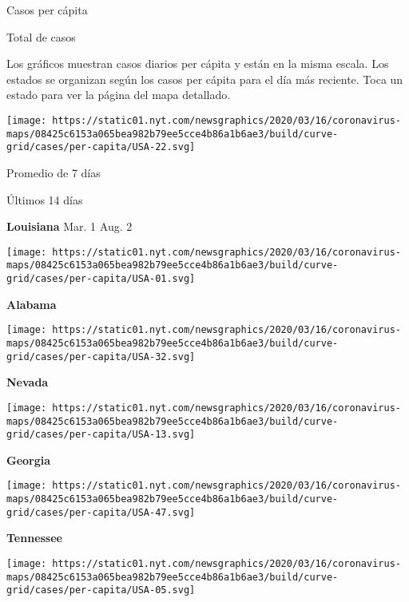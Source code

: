Casos per cápita

Total de casos

Los gráficos muestran casos diarios per cápita y están en la misma
escala. Los estados se organizan según los casos per cápita para el día
más reciente. Toca un estado para ver la página del mapa detallado.

\href{https://www.nytimes.com/interactive/2020/us/louisiana-coronavirus-cases.html}{}

\texttt{[image: https://static01.nyt.com/newsgraphics/2020/03/16/coronavirus-maps/08425c6153a065bea982b79ee5cce4b86a1b6ae3/build/curve-grid/cases/per-capita/USA-22.svg]}

Promedio de 7 días

Últimos 14 días

\textbf{Louisiana} Mar. 1 Aug. 2

\href{https://www.nytimes.com/interactive/2020/us/alabama-coronavirus-cases.html}{}

\texttt{[image: https://static01.nyt.com/newsgraphics/2020/03/16/coronavirus-maps/08425c6153a065bea982b79ee5cce4b86a1b6ae3/build/curve-grid/cases/per-capita/USA-01.svg]}

\textbf{Alabama}

\href{https://www.nytimes.com/interactive/2020/us/nevada-coronavirus-cases.html}{}

\texttt{[image: https://static01.nyt.com/newsgraphics/2020/03/16/coronavirus-maps/08425c6153a065bea982b79ee5cce4b86a1b6ae3/build/curve-grid/cases/per-capita/USA-32.svg]}

\textbf{Nevada}

\href{https://www.nytimes.com/interactive/2020/us/georgia-coronavirus-cases.html}{}

\texttt{[image: https://static01.nyt.com/newsgraphics/2020/03/16/coronavirus-maps/08425c6153a065bea982b79ee5cce4b86a1b6ae3/build/curve-grid/cases/per-capita/USA-13.svg]}

\textbf{Georgia}

\href{https://www.nytimes.com/interactive/2020/us/tennessee-coronavirus-cases.html}{}

\texttt{[image: https://static01.nyt.com/newsgraphics/2020/03/16/coronavirus-maps/08425c6153a065bea982b79ee5cce4b86a1b6ae3/build/curve-grid/cases/per-capita/USA-47.svg]}

\textbf{Tennessee}

\href{https://www.nytimes.com/interactive/2020/us/arkansas-coronavirus-cases.html}{}

\texttt{[image: https://static01.nyt.com/newsgraphics/2020/03/16/coronavirus-maps/08425c6153a065bea982b79ee5cce4b86a1b6ae3/build/curve-grid/cases/per-capita/USA-05.svg]}

